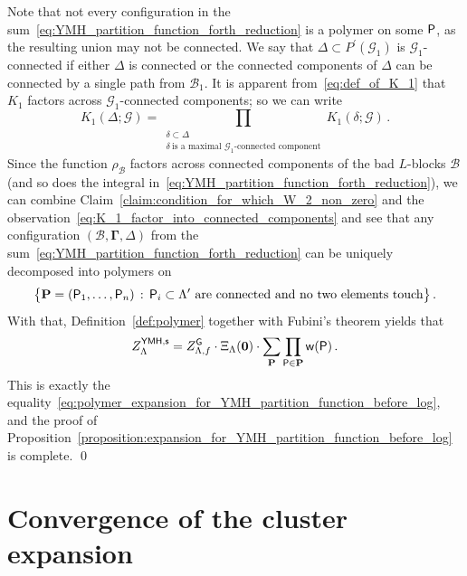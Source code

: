 \documentclass[11pt]{article}
\theoremstyle{definition}
\theoremstyle{remark}
\numberwithin{theorem}{section}
\def\La{{\Lambda}}
\def\Ga{{\Gamma}}
\newcommand{\cB}{\mathcal B}
\begin{document}
    \noindent
    Note that not every configuration in the sum~\eqref{eq:YMH_partition_function_forth_reduction} is a polymer on some ${\sf P}$, as the resulting union may not be connected. We say that $\Delta \subset P^\prime(\mathcal{G}_1)$ is $\mathcal{G}_1$-connected if either $\Delta$ is connected or the connected components of $\Delta$ can be connected by a single path from $\mathcal{B}_1$. It is apparent from~\eqref{eq:def_of_K_1} that $K_1$ factors across $\mathcal{G}_1$-connected components; so we can write
    \begin{equation}\label{eq:K_1_factor_into_connected_components}
    K_1(\Delta;\mathcal{G}) = \prod_{\substack{\delta\subset \Delta \\ \delta \ \text{is a maximal  $\mathcal{G}_1$-connected component}}} K_1(\delta;\mathcal{G}) \, .
    \end{equation}
    Since the function $\rho_\cB$ factors across connected components of the bad $L$-blocks $\cB$ (and so does the integral in~\eqref{eq:YMH_partition_function_forth_reduction}), we can combine Claim~\ref{claim:condition_for_which_W_2_non_zero} and the observation~\eqref{eq:K_1_factor_into_connected_components} and see that any configuration $(\cB,\boldsymbol{\Ga},\Delta)$ from the sum~\eqref{eq:YMH_partition_function_forth_reduction} can be uniquely decomposed into polymers on
    \[
    \big\{ \mathbf{P} =  ({\sf P}_1,\ldots,{\sf P}_n) \, : \, {\sf P}_i \subset \La^\prime \  \text{are connected and no two elements touch} \big\} \, .
    \]
     With that, Definition~\ref{def:polymer} together with Fubini's theorem yields that
    \begin{equation*}
        Z_{\Lambda}^{\sf YMH,s}  = Z_{\Lambda,f}^{\sf G} \cdot \Xi_{\Lambda}(\mathbf{0}) \cdot\sum_{\mathbf{P}} \prod_{{\sf P}\in \mathbf{P}} {\sf w}({\sf P}) \, .
    \end{equation*}
    This is exactly the equality~\eqref{eq:polymer_expansion_for_YMH_partition_function_before_log}, and the proof of Proposition~\ref{proposition:expansion_for_YMH_partition_function_before_log} is complete. 
    \qed
    
    \section{Convergence of the cluster expansion}
    \label{sec:convergence_of_cluster_expansion}
    
\end{document}
